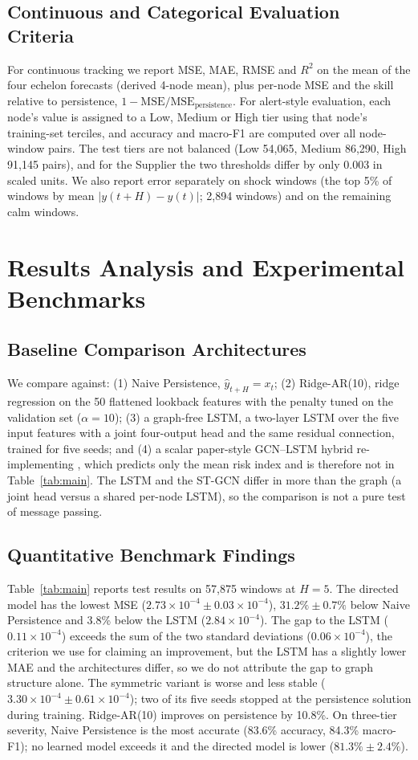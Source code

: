 \documentclass[conference]{IEEEtran}
\begin{document}
\subsection{Continuous and Categorical Evaluation Criteria}
For continuous tracking we report MSE, MAE, RMSE and $R^2$ on the mean of the four echelon forecasts (derived 4-node mean), plus per-node MSE and the skill relative to persistence, $1-\mathrm{MSE}/\mathrm{MSE}_{\mathrm{persistence}}$. For alert-style evaluation, each node's value is assigned to a Low, Medium or High tier using that node's training-set terciles, and accuracy and macro-F1 are computed over all node-window pairs. The test tiers are not balanced (Low 54,065, Medium 86,290, High 91,145 pairs), and for the Supplier the two thresholds differ by only 0.003 in scaled units. We also report error separately on shock windows (the top 5\% of windows by mean $|y(t+H)-y(t)|$; 2,894 windows) and on the remaining calm windows.

\section{Results Analysis and Experimental Benchmarks}
\subsection{Baseline Comparison Architectures}
We compare against: (1) Naive Persistence, $\hat{y}_{t+H}=x_t$; (2) Ridge-AR(10), ridge regression \cite{r11} on the 50 flattened lookback features with the penalty tuned on the validation set ($\alpha=10$); (3) a graph-free LSTM, a two-layer LSTM over the five input features with a joint four-output head and the same residual connection, trained for five seeds; and (4) a scalar paper-style GCN--LSTM hybrid re-implementing \cite{r10}, which predicts only the mean risk index and is therefore not in Table~\ref{tab:main}. The LSTM and the ST-GCN differ in more than the graph (a joint head versus a shared per-node LSTM), so the comparison is not a pure test of message passing.

\subsection{Quantitative Benchmark Findings}
Table~\ref{tab:main} reports test results on 57,875 windows at $H=5$. The directed model has the lowest MSE ($2.73\times10^{-4}\pm0.03\times10^{-4}$), $31.2\%\pm0.7\%$ below Naive Persistence and 3.8\% below the LSTM ($2.84\times10^{-4}$). The gap to the LSTM ($0.11\times10^{-4}$) exceeds the sum of the two standard deviations ($0.06\times10^{-4}$), the criterion we use for claiming an improvement, but the LSTM has a slightly lower MAE and the architectures differ, so we do not attribute the gap to graph structure alone. The symmetric variant is worse and less stable ($3.30\times10^{-4}\pm0.61\times10^{-4}$); two of its five seeds stopped at the persistence solution during training. Ridge-AR(10) improves on persistence by 10.8\%. On three-tier severity, Naive Persistence is the most accurate (83.6\% accuracy, 84.3\% macro-F1); no learned model exceeds it and the directed model is lower ($81.3\%\pm2.4\%$).
\end{document}
